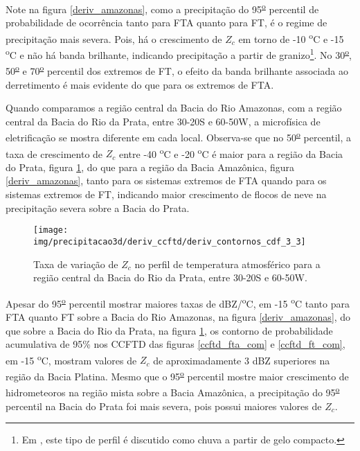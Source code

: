 Note na figura \ref{deriv_amazonas}, como a precipitação do 95\textsuperscript{\underline{o}} percentil de probabilidade de ocorrência tanto para FTA quanto para FT, é o regime de precipitação mais severa. Pois, há o crescimento de $Z_c$ em torno de -10 \textsuperscript{o}C e -15 \textsuperscript{o}C e não há banda brilhante, indicando precipitação a partir de granizo\footnote{Em \cite{Fabry1995}, este tipo de perfil é discutido como chuva a partir de gelo compacto.}. No 30\textsuperscript{\underline{o}}, 50\textsuperscript{\underline{o}} e 70\textsuperscript{\underline{o}} percentil dos extremos de FT, o efeito da banda brilhante associada ao derretimento é mais evidente do que para os extremos de FTA. 

Quando comparamos a região central da Bacia do Rio Amazonas, com a região central da Bacia do Rio da Prata, entre 30-20S e 60-50W, a microfísica de eletrificação se mostra diferente em cada local. Observa-se que no 50\textsuperscript{\underline{o}} percentil, a taxa de crescimento de $Z_c$ entre -40 \textsuperscript{o}C e -20 \textsuperscript{o}C é maior para a região da Bacia do Prata, figura \ref{deriv_prata}, do que para a região da Bacia Amazônica, figura \ref{deriv_amazonas}, tanto para os sistemas extremos de FTA quando para os sistemas extremos de FT, indicando maior crescimento de flocos de neve na precipitação severa sobre a Bacia do Prata. 


\begin{figure}[!ht]
  \centering
  \texttt{[image: img/precipitacao3d/deriv\_ccftd/deriv\_contornos\_cdf\_3\_3]}
  \caption{Taxa de variação de $Z_c$ no perfil de temperatura atmosférico para a região central da Bacia do Rio da Prata, entre 30-20S e 60-50W.}
  \label{deriv_prata}  
\end{figure} 

Apesar do 95\textsuperscript{\underline{o}} percentil mostrar maiores taxas de dBZ/\textsuperscript{o}C, em -15 \textsuperscript{o}C tanto para FTA quanto FT sobre a Bacia do Rio Amazonas, na figura \ref{deriv_amazonas}, do que sobre a Bacia do Rio da Prata, na figura \ref{deriv_prata}, os contorno de probabilidade acumulativa de 95\% nos CCFTD das figuras \ref{ccftd_fta_com} e \ref{ccftd_ft_com}, em -15 \textsuperscript{o}C, mostram valores de $Z_c$ de aproximadamente 3 dBZ superiores na região da Bacia Platina. Mesmo que o 95\textsuperscript{\underline{o}} percentil mostre maior crescimento de hidrometeoros na região mista sobre a Bacia Amazônica, a precipitação do 95\textsuperscript{\underline{o}} percentil na Bacia do Prata foi mais severa, pois possui maiores valores de $Z_c$.


